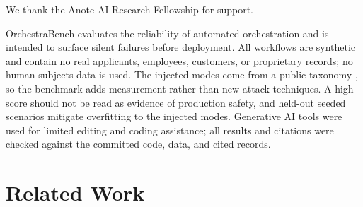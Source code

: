 \documentclass[11pt,a4paper]{article}
\begin{document}
\begin{aespubliconly}
We thank the Anote AI Research Fellowship for support.
\end{aespubliconly}

OrchestraBench evaluates the reliability of automated orchestration and is
intended to surface silent failures before deployment. All workflows are
synthetic and contain no real applicants, employees, customers, or proprietary
records; no human-subjects data is used. The injected modes come from a public
taxonomy \citep{mast}, so the benchmark adds measurement rather than new attack
techniques. A high score should not be read as evidence of production safety,
and held-out seeded scenarios mitigate overfitting to the injected modes.
Generative AI tools were used for limited editing and coding assistance; all
results and citations were checked against the committed code, data, and cited
records.



\appendix

\section{Related Work}
\label{app:related}
\end{document}
